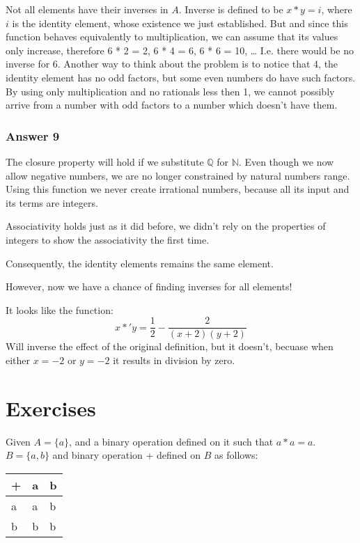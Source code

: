 \documentclass[11pt]{article}
\begin{document}
Not all elements have their inverses in $A$. Inverse is defined to be $x * y = i$,
where $i$ is the identity element, whose existence we just established.  But
and since this function behaves equivalently to multiplication, we can assume
that its values only increase, therefore 6 * 2 = 2, 6 * 4 = 6, 6 * 6 = 10, \ldots{}
I.e. there would be no inverse for 6.  Another way to think about the problem
is to notice that 4, the identity element has no odd factors, but some even
numbers do have such factors.  By using only multiplication and no rationals less
then 1, we cannot possibly arrive from a number with odd factors to a number which
doesn't have them.
\subsubsection{Answer 9}
\label{sec-1-3-2}
The closure property will hold if we substitute $\mathbb{Q}$ for $\mathbb{N}$.
Even though we now allow negative numbers, we are no longer constrained by natural
numbers range.  Using this function we never create irrational numbers, because
all its input and its terms are integers.

Associativity holds just as it did before, we didn't rely on the properties of
integers to show the associativity the first time.

Consequently, the identity elements remains the same element.

However, now we have a chance of finding inverses for all elements!

It looks like the function:
\begin{equation}
x *' y = \frac{1}{2} - \frac{2}{(x + 2)(y + 2)}
\end{equation}
Will inverse the effect of the original definition, but it doesn't, becuase when
either $x = -2$ or $y = -2$ it results in division by zero.
\section{Exercises}
\label{sec-2}
Given $A = \{a\}$, and a binary operation defined on it such that $a * a = a$.
$B = \{a, b\}$ and binary operation + defined on $B$ as follows:

\begin{center}
\begin{tabular}{lll}
+ & a & b\\
\hline
a & a & b\\
b & b & b\\
\end{tabular}
\end{center}
\end{document}
